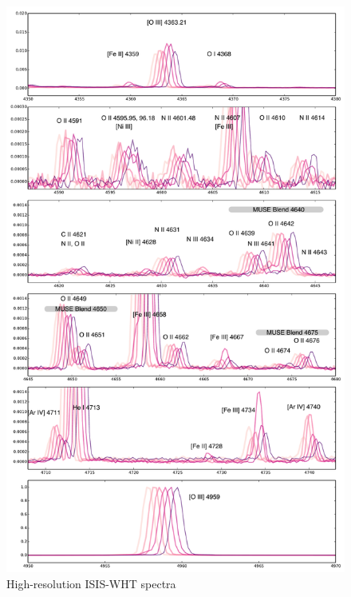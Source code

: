 \documentclass[useAMS, usenatbib]{mnras}
\begin{document}
\begin{figure}
  \centering
  \includegraphics[width=\linewidth]{figs/adal-slit6-oii-v1-annotated}
  \caption{High-resolution ISIS-WHT spectra}
  \label{fig:adal-pink-spectra}
\end{figure}
\end{document}
